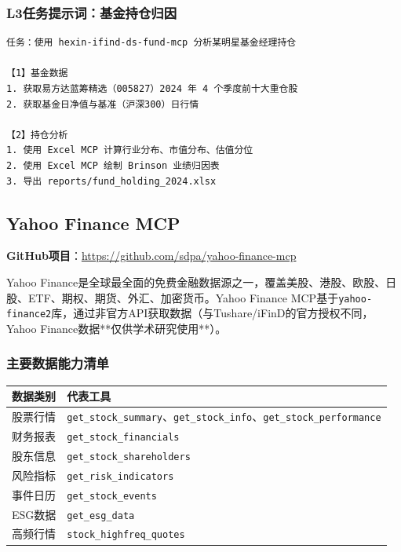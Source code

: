 \subsubsection{L3任务提示词：基金持仓归因}

\begin{lstlisting}
任务：使用 hexin-ifind-ds-fund-mcp 分析某明星基金经理持仓

【1】基金数据
1. 获取易方达蓝筹精选（005827）2024 年 4 个季度前十大重仓股
2. 获取基金日净值与基准（沪深300）日行情

【2】持仓分析
1. 使用 Excel MCP 计算行业分布、市值分布、估值分位
2. 使用 Excel MCP 绘制 Brinson 业绩归因表
3. 导出 reports/fund_holding_2024.xlsx
\end{lstlisting}

\subsection{Yahoo Finance MCP}

\textbf{GitHub项目}：\url{https://github.com/sdpa/yahoo-finance-mcp}

Yahoo Finance是全球最全面的免费金融数据源之一，覆盖美股、港股、欧股、日股、ETF、期权、期货、外汇、加密货币。Yahoo Finance MCP基于\texttt{yahoo-finance2}库，通过非官方API获取数据（与Tushare/iFinD的官方授权不同，Yahoo Finance数据**仅供学术研究使用**）。

\subsubsection{主要数据能力清单}

\begin{table}[H]
\centering
\small
\begin{tabular}{ll}
\toprule
\textbf{数据类别} & \textbf{代表工具} \\
\midrule
股票行情 & \texttt{get\_stock\_summary}、\texttt{get\_stock\_info}、\texttt{get\_stock\_performance} \\
财务报表 & \texttt{get\_stock\_financials} \\
股东信息 & \texttt{get\_stock\_shareholders} \\
风险指标 & \texttt{get\_risk\_indicators} \\
事件日历 & \texttt{get\_stock\_events} \\
ESG数据 & \texttt{get\_esg\_data} \\
高频行情 & \texttt{stock\_highfreq\_quotes} \\
\bottomrule
\end{tabular}
\end{table}

